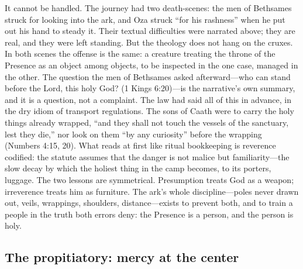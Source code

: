 It cannot be handled. The journey had two death-scenes: the men of
Bethsames struck for looking into the ark, and Oza struck ``for his
rashness'' when he put out his hand to steady it. Their textual
difficulties were narrated above; they are real, and they were left
standing. But the theology does not hang on the cruxes. In both scenes
the offense is the same: a creature treating the throne of the
Presence as an object among objects, to be inspected in the one case,
managed in the other. The question the men of Bethsames asked
afterward---who can stand before the Lord, this holy God? (1 Kings
6:20)---is the narrative's own summary, and it is a question, not a
complaint. The law had said all of
this in advance, in the dry idiom of transport regulations. The sons of
Caath were to carry the holy things already wrapped, ``and they shall
not touch the vessels of the sanctuary, lest they die,'' nor look on
them ``by any curiosity'' before the wrapping (Numbers 4:15, 20). What
reads at first like ritual bookkeeping is reverence codified: the
statute assumes that the danger is not malice but familiarity---the
slow decay by which the holiest thing in the camp becomes, to its
porters, luggage. The two lessons are symmetrical.
Presumption treats God as a weapon; irreverence treats him
as furniture. The ark's whole discipline---poles never drawn out,
veils, wrappings, shoulders, distance---exists to prevent both, and to
train a people in the truth both errors deny: the Presence is a person,
and the person is holy.

\subsection{The propitiatory: mercy at the center}


